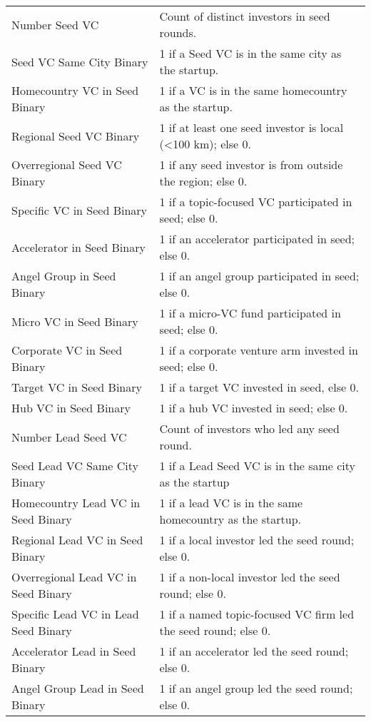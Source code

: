 {\begin{tabular}{p{} p{}}
Number Seed VC & Count of distinct investors in seed rounds. \\[0.4em]
Seed VC Same City Binary & 1 if a Seed VC is in the same city as the startup. \\[0.4em]
Homecountry VC in Seed Binary & 1 if a VC is in the same homecountry as the startup. \\[0.4em]
Regional Seed VC Binary & 1 if at least one seed investor is local (<100 km); else 0. \\[0.4em]
Overregional Seed VC Binary & 1 if any seed investor is from outside the region; else 0. \\[0.4em]
Specific VC in Seed Binary & 1 if a topic-focused VC participated in seed; else 0. \\[0.4em]
Accelerator in Seed Binary & 1 if an accelerator participated in seed; else 0. \\[0.4em]
Angel Group in Seed Binary & 1 if an angel group participated in seed; else 0. \\[0.4em]
Micro VC in Seed Binary & 1 if a micro-VC fund participated in seed; else 0. \\[0.4em]
Corporate VC in Seed Binary & 1 if a corporate venture arm invested in seed; else 0. \\[0.4em]
Target VC in Seed Binary & 1 if a target VC invested in seed, else 0. \\[0.4em]
Hub VC in Seed Binary & 1 if a hub VC invested in seed; else 0. \\[0.4em]
Number Lead Seed VC & Count of investors who led any seed round. \\[0.4em]
Seed Lead VC Same City Binary & 1 if a Lead Seed VC is in the same city as the startup \\[0.4em]
Homecountry Lead VC in Seed Binary & 1 if a lead VC is in the same homecountry as the startup. \\[0.4em]
Regional Lead VC in Seed Binary & 1 if a local investor led the seed round; else 0. \\[0.4em]
Overregional Lead VC in Seed Binary & 1 if a non-local investor led the seed round; else 0. \\[0.4em]
Specific Lead VC in Lead Seed Binary & 1 if a named topic-focused VC firm led the seed round; else 0. \\[0.4em]
Accelerator Lead in Seed Binary & 1 if an accelerator led the seed round; else 0. \\[0.4em]
Angel Group Lead in Seed Binary & 1 if an angel group led the seed round; else 0. \\[0.4em]

\end{tabular}}
